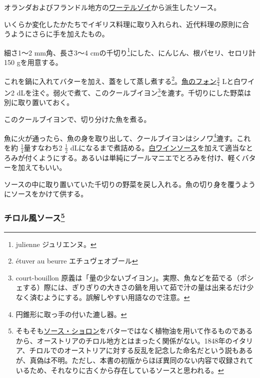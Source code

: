\begin{recette}
オランダおよびフランドル地方の\protect\hyperlink{}{ワーテルゾイ}から派生したソース。

いくらか変化したかたちでイギリス料理に取り入れられ、近代料理の原則に合うようにさらに手を加えたもの。

細さ1〜2 mm角、長さ3〜4 cmの千切り\footnote{julienne ジュリエンヌ。}にした、にんじん、根パセリ、セロリ計150
gを用意する。

これを鍋に入れてバターを加え、蓋をして蒸し煮する\footnote{étuver au
  beurre エチュヴェオブール}。\protect\hyperlink{fumet-de-poisson}{魚のフォン}\(\frac{3}{4}\)
Lと白ワイン2 dLを注ぐ。弱火で煮て、このクールブイヨン\footnote{court-bouillon
  原義は「量の少ないブイヨン」。実際、魚などを茹でる（ポシェする）際には、ぎりぎりの大きさの鍋を用いて茹で汁の量は出来るだけ少なく済むようにする。誤解しやすい用語なので注意。}を漉す。千切りにした野菜は別に取り置いておく。

このクールブイヨンで、切り分けた魚を煮る。

魚に火が通ったら、魚の身を取り出して、クールブイヨンはシノワ\footnote{円錐形に取っ手の付いた漉し器。}漉す。これを約
\(\frac{1}{4}\)量すなわち2 \(\frac{1}{2}\)
dLになるまで煮詰める。\protect\hyperlink{sauce-vin-blanc}{白ワインソース}を加えて適当なとろみが付くようにする。あるいは単純にブールマニエでとろみを付け、軽くバターを加えてもいい。

ソースの中に取り置いていた千切りの野菜を戻し入れる。魚の切り身を覆うようにソースをかけて供する。

\hypertarget{sauce-tyrolienne}{%
\subsubsection[チロル風ソース]{\texorpdfstring{チロル風ソース\footnote{そもそも\protect\hyperlink{sauce-choron}{ソース・ショロン}をバターではなく植物油を用いて作るものであるから、オーストリアのチロル地方とはまったく関係がない。1848年のイタリア、チロルでのオーストリアに対する反乱を記念した命名だという説もあるが、真偽は不明。ただし、本書の初版からほぼ異同のない内容で収録されているため、それなりに古くから存在しているソースと思われる。}}{チロル風ソース}}\label{sauce-tyrolienne}}




\end{recette}
